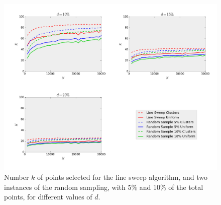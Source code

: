 \begin{figure}[!h] 
	\centering
	\includegraphics[width=0.8\linewidth]{Pictures/ls_rs_k} 
	\caption[Number $k$ of points selected for Line Sweep and Random Sampling algorithms.]{Number $k$ of points selected for the line sweep algorithm, and two instances of the random sampling, with 5\% and 10\% of the total points, for different values of $d$.}
	\label{fig:ls_rs_k} 
\end{figure}